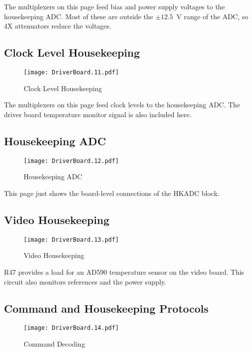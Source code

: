 The multiplexers on this page feed bias and power supply voltages to the housekeeping ADC. Most of these are outside the $\pm 12.5$\ V range of the ADC, so 4X attenuators reduce the voltages.


\subsection{Clock Level Housekeeping}
   \begin{figure}
   \begin{center}
   \texttt{[image: DriverBoard.11.pdf]}
   \end{center}
   \caption{Clock Level Housekeeping}
   \end{figure}

The multiplexers on this page feed clock levels to the housekeeping ADC. The driver board temperature monitor signal is also included here.


\subsection{Housekeeping ADC}

   \begin{figure}
   \begin{center}
   \texttt{[image: DriverBoard.12.pdf]}
   \end{center}
   \caption{Housekeeping ADC}
   \end{figure}

This page just shows the board-level connections of the HKADC block.


\subsection{Video Housekeeping}

   \begin{figure}
   \begin{center}
   \texttt{[image: DriverBoard.13.pdf]}
   \end{center}
   \caption{Video Housekeeping}
   \end{figure}


R47 provides a load for an AD590 temperature sensor on the video board. This circuit also monitors references and the power supply.


\subsection{Command and Housekeeping Protocols}
   \begin{figure}
   \begin{center}
   \texttt{[image: DriverBoard.14.pdf]}
   \end{center}
   \caption{Command Decoding}
   \end{figure}

